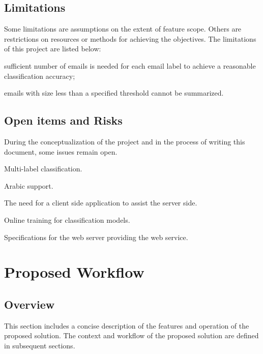 \documentclass[a4paper,10pt]{article}
\newenvironment{my_itemize}
{\begin{itemize}
  \setlength{\itemsep}{0cm}
  \setlength{\parskip}{0cm}}
{\end{itemize}}
\begin{document}
\subsection{Limitations}
Some limitations are assumptions on the extent of feature scope. Others are restrictions on resources 
or methods for achieving the objectives. The limitations of this project are listed below:

\begin{my_itemize}
  \item sufficient number of emails is needed for each email label to achieve 
	a reasonable classification accuracy;
  \item emails with size less than a specified threshold cannot be summarized.
\end{my_itemize}

\subsection{Open items and Risks}
During the conceptualization of the project and in the process of writing this document, 
some issues remain open.
\begin{my_itemize}
  \item Multi-label classification.
  \item Arabic support.
  \item The need for a client side application to assist the server side.
  \item Online training for classification models.
  \item Specifications for the web server providing the web service.
\end{my_itemize}


\newpage
\section{Proposed Workflow}
\subsection{Overview}
This section includes a concise description of the features and operation of the 
proposed solution. The context and workflow of the proposed solution are defined in subsequent sections.
\end{document}
